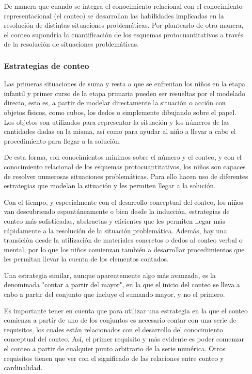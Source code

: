 \documentclass{article}
\begin{document}
De manera que cuando se integra el conocimiento relacional con el conocimiento representacional (el conteo) se desarrollan las habilidades implicadas en la resolución de distintas situaciones problemáticas. Por plantearlo de otra manera, el conteo supondría la cuantificación de los esquemas protocuantitativos a través de la resolución de situaciones problemáticas. 

\subsubsection{Estrategias de conteo}
Las primeras situaciones de suma y resta a que se enfrentan los niños en la etapa infantil y primer curso de la etapa primaria pueden ser resueltas por el modelado directo, esto es, a partir de modelar directamente la situación o acción con objetos físicos, como cubos, los dedos o simplemente dibujando sobre el papel. Los objetos son utilizados para representar la situación y los números de las cantidades dadas en la misma, así como para ayudar al niño a llevar a cabo el procedimiento para llegar a la solución.

De esta forma, con conocimientos mínimos sobre el número y el conteo, y con el conocimiento relacional de los esquemas protocuantitativos, los niños son capaces de resolver numerosas situaciones problemáticas. Para ello hacen uso de diferentes estrategias que modelan la situación y les permiten llegar a la solución.

Con el tiempo, y especialmente con el desarrollo conceptual del conteo, los niños van descubriendo espontáneamente o bien desde la inducción, estrategias de conteo más sofisticadas, abstractas y eficientes que les permiten llegar más rápidamente a la resolución de la situación problemática. Además, hay una transición desde la utilización de materiales concretos o dedos al conteo verbal o mental, por lo que los niños comienzan también a desarrollar procedimientos que les permitan llevar la cuenta de los elementos contados. 

Una estrategia similar, aunque aparentemente algo más avanzada, es la denominada "contar a partir del mayor", en la que el inicio del conteo se lleva a cabo a partir del conjunto que incluye el sumando mayor, y no el primero. 

Es importante tener en cuenta que para utilizar una estrategia en la que el conteo comienza a partir de uno de los conjuntos es necesario contar con una serie de requisitos, los cuales están relacionados con el desarrollo del conocimiento conceptual del conteo. Así, el primer requisito y más evidente es poder comenzar el conteo a partir de cualquier punto arbitrario de la serie numérica. Otros requisitos tienen que ver con el significado de las relaciones entre conteo y cardinalidad.
\end{document}
